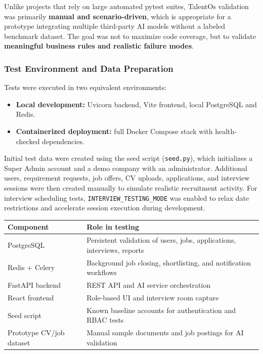 Unlike projects that rely on large automated pytest suites, TalentOs validation was primarily \textbf{manual and scenario-driven}, which is appropriate for a prototype integrating multiple third-party AI models without a labeled benchmark dataset. The goal was not to maximize code coverage, but to validate \textbf{meaningful business rules and realistic failure modes}.

\subsubsection{Test Environment and Data Preparation}
\label{sec:ch5:test_environment}

Tests were executed in two equivalent environments:
\begin{itemize}
    \item \textbf{Local development:} Uvicorn backend, Vite frontend, local PostgreSQL and Redis.
    \item \textbf{Containerized deployment:} full Docker Compose stack with health-checked dependencies.
\end{itemize}

Initial test data were created using the seed script (\texttt{seed.py}), which initializes a Super Admin account and a demo company with an administrator. Additional users, requirement requests, job offers, CV uploads, applications, and interview sessions were then created manually to simulate realistic recruitment activity. For interview scheduling tests, \texttt{INTERVIEW\_TESTING\_MODE} was enabled to relax date restrictions and accelerate session execution during development.

\begin{center}
\label{tab:test_environment}
\renewcommand{\arraystretch}{1.15}
\begin{tabularx}{\textwidth}{|l|X|}
\hline
\rowcolor{gray!20} \textbf{Component} & \textbf{Role in testing} \\
\hline
PostgreSQL & Persistent validation of users, jobs, applications, interviews, reports \\
\hline
Redis + Celery & Background job closing, shortlisting, and notification workflows \\
\hline
FastAPI backend & REST API and AI service orchestration \\
\hline
React frontend & Role-based UI and interview room capture \\
\hline
Seed script & Known baseline accounts for authentication and RBAC tests \\
\hline
Prototype CV/job dataset & Manual sample documents and job postings for AI validation \\
\hline
\end{tabularx}
\end{center}

